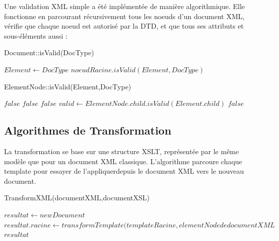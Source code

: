 Une validation XML simple a été implémentée de manière algorithmique. Elle fonctionne en parcourant récursivement tous les noeuds d'un document XML, vérifie que chaque noeud est autorisé par la DTD, et que tous ses attributs et sous-éléments aussi :

\begin{algorithm}
\caption{Document::isValid(DocType)}
\begin{algorithmic}
\STATE $Element \leftarrow DocType$
\RETURN $noeudRacine.isValid(Element,DocType)$
\end{algorithmic}
\end{algorithm}

\begin{algorithm}
\caption{ElementNode::isValid(Element,DocType)}
\begin{algorithmic}
\RETURN $false$
\ENDIF
{}
\RETURN $false$
\ENDIF
\ENDFOR
{}
\RETURN $false$
\ENDIF
\STATE $valid \leftarrow ElementNode.child.isValid(Element.child)$
\RETURN $false$
\ENDIF
\ENDFOR
\end{algorithmic}
\end{algorithm}

\subsection{Algorithmes de Transformation}

La transformation se base sur une structure XSLT, représentée par le même modèle que pour un document XML classique. L'algorithme parcoure chaque template pour essayer de l'appliquerdepuis le document XML vers le nouveau document.

\begin{algorithm}
\caption{TransformXML(documentXML,documentXSL)}
\begin{algorithmic}
\STATE $resultat \leftarrow new Document$
\STATE $resultat.racine \leftarrow transformTemplate(templateRacine,elementNode de documentXML$
\ENDIF
\ENDFOR
\RETURN $resultat$
\end{algorithmic}
\end{algorithm}

